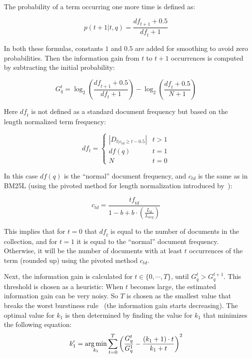 The probability of a term occurring one more time is defined as:

\begin{equation}
	p(t+1|t,q) = \frac{\mathit{df}_{t+1}+0.5}{\mathit{df}_t+1}
\end{equation}

In both these formulas, constants $1$ and $0.5$ are added for smoothing to avoid zero probabilities. Then the information gain from $t$ to $t+1$ occurrences is computed by subtracting the initial probability: 

\begin{equation}
	G^t_q = \log_2\left(\frac{\mathit{df}_{t+1} + 0.5}{\mathit{df}_t+1}\right) - \log_2 \left(\frac{\mathit{df}_{t} + 0.5}{N+1}\right)
\end{equation}

Here $\mathit{df}_t$ is not defined as a standard document frequency but based on the length normalized term frequency:

\begin{equation}
	df_t = 
	\begin{cases}
		|D_{t|c_{td}\geq t-0.5}| & t > 1\\ 
		df(q) & t = 1\\
		N & t = 0
	\end{cases}
\end{equation}

In this case $\mathit{df}(q)$ is the ``normal'' document frequency, and $c_{\mathit{td}}$ is the same as in BM25L (using the pivoted method for length normalization introduced by~\cite{ctd}):

\begin{equation}
	c_{\mathit{td}} = \frac{\mathit{tf}_{\mathit{td}}}{1-b+b\cdot\left(\frac{L_d}{L_{\mathit{avg}}}\right)}
\end{equation}

This implies that for $t = 0$ that $\mathit{df}_t$ is equal to the number of documents in the collection, and for $t = 1$ it is equal to the ``normal'' document frequency. Otherwise, it will be the number of documents with at least $t$ occurrences of the term (rounded up) using the pivoted method $c_{\mathit{td}}$. 

Next, the information gain is calculated for $t \in \{0,\cdots,T\}$, until $G^t_q > G^{t+1}_q$. This threshold is chosen as a heuristic: When $t$ becomes large, the estimated information gain can be very noisy. So $T$ is chosen as the smallest value that breaks the worst burstiness rule~\citep{burstiness_rule} (the information gain starts decreasing). The optimal value for $k_1$ is then determined by finding the value for $k_1$ that minimizes the following equation:
\begin{equation}
	k'_1 = \operatorname*{arg\,min}_{k_1} \sum_{t=0}^{T}\left(\frac{G^t_q}{G^1_q} - \frac{(k_1+1)\cdot t}{k_1+t}\right)^2
\end{equation}


